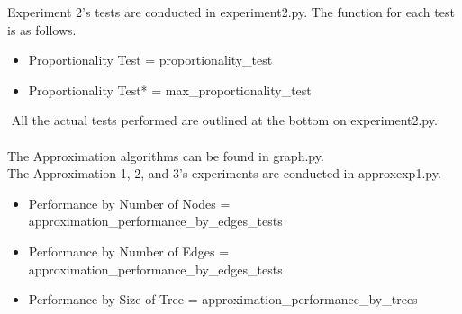 \documentclass[12pt]{article}
\begin{document}
Experiment 2's tests are conducted in experiment2.py.
The function for each test is as follows.
\begin{itemize}
    \item Proportionality Test = proportionality\_test\(\)
    \item Proportionality Test* = max\_proportionality\_test\(\)
\end{itemize}
$ $
\newline
All the actual tests performed are outlined at the bottom on experiment2.py.
\\
\\


The Approximation algorithms can be found in graph.py. \\
The Approximation 1, 2, and 3's experiments are conducted in approxexp1.py.
\\
\begin{itemize}
    \item Performance by Number of Nodes = approximation\_performance\_by\_edges\_tests\(\)
    \item Performance by Number of Edges = approximation\_performance\_by\_edges\_tests\(\)
    \item Performance by Size of Tree = approximation\_performance\_by\_trees\(\)
\end{itemize}




\end{document}
